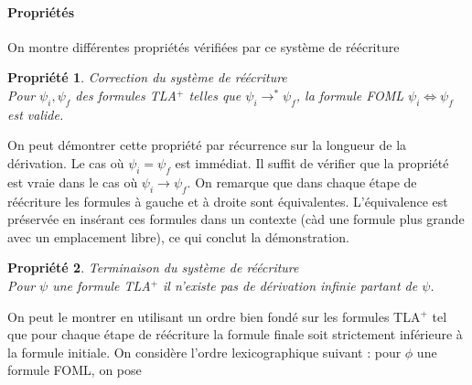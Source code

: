 \documentclass[12pt]{article}
\newtheorem{prop}{Propriété}
\begin{document}
\paragraph{Propriétés}

On montre différentes propriétés vérifiées par ce système de réécriture

\begin{prop} \emph{Correction du système de réécriture} \\
  Pour $\psi_i, \psi_f$ des formules TLA$^+$ telles que $\psi_i \longrightarrow^* \psi_f$,
  la formule FOML $\psi_i \Leftrightarrow \psi_f$ est valide.
\end{prop}

On peut démontrer cette propriété par récurrence sur la longueur de la dérivation.
Le cas où $\psi_i = \psi_f$ est immédiat. Il suffit de vérifier que la propriété est vraie dans le cas où $\psi_i \longrightarrow \psi_f$.
On remarque que dans chaque étape de réécriture les formules à gauche et à droite sont équivalentes.
L'équivalence est préservée en insérant ces formules dans un contexte (càd une formule plus grande avec un emplacement libre), ce qui conclut la démonstration.

\begin{prop} \emph{Terminaison du système de réécriture} \\
  Pour $\psi$ une formule TLA$^+$ il n'existe pas de dérivation infinie partant de $\psi$.
\end{prop}

On peut le montrer en utilisant un ordre bien fondé sur les formules TLA$^+$ tel que pour chaque étape de réécriture la formule finale soit strictement inférieure à la formule initiale.
On considère l'ordre lexicographique suivant :
pour $\phi$ une formule FOML, on pose
\begin{comment}
\begin{itemize}
\item $a$ est la hauteur maximale d'un symbole $\Leftrightarrow$ dans $\phi$ (on peut représenter $\phi$ sous forme d'un arbre où un noeud est un opérateur et ses fils sont ses arguments)
\end{itemize}
\end{comment}
\end{document}
